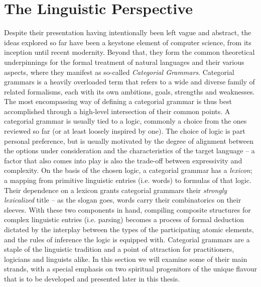 \section{The Linguistic Perspective}\label{section:linguistics}
Despite their presentation having intentionally been left vague and abstract, the ideas explored so far have been a keystone element of computer science, from its inception until recent modernity.
Beyond that, they form the common theoretical underpinnings for the formal treatment of natural languages and their various aspects, where they manifest as so-called \textit{Categorial Grammars}.
Categorial grammars is a heavily overloaded term that refers to a wide and diverse family of related formalisms, each with its own ambitions, goals, strengths and weaknesses.
The most encompassing way of defining a categorial grammar is thus best accomplished through a high-level intersection of their common points.
A categorial grammar is usually tied to a logic, commonly a choice from the ones reviewed so far (or at least loosely inspired by one).
The choice of logic is part personal preference, but is usually motivated by the degree of alignment between the options under consideration and the characteristics of the target language -- a factor that also comes into play is also the trade-off between expressivity and complexity.
On the basis of the chosen logic, a categorial grammar has a \textit{lexicon}; a mapping from primitive linguistic entries (i.e. words) to formulas of that logic.
Their dependence on a lexicon grants categorial grammars their \textit{strongly lexicalized} title -- as the slogan goes, words carry their combinatorics on their sleeves.
With these two components in hand, compiling composite structures for complex linguistic entries (i.e. parsing) becomes a process of formal deduction dictated by the interplay between the types of the participating atomic elements, and the rules of inference the logic is equipped with.
Categorial grammars are a staple of the linguistic tradition and a point of attraction for practitioners, logicians and linguists alike. 
In this section we will examine some of their main strands, with a special emphasis on two spiritual progenitors of the unique flavour that is to be developed and presented later in this thesis.

